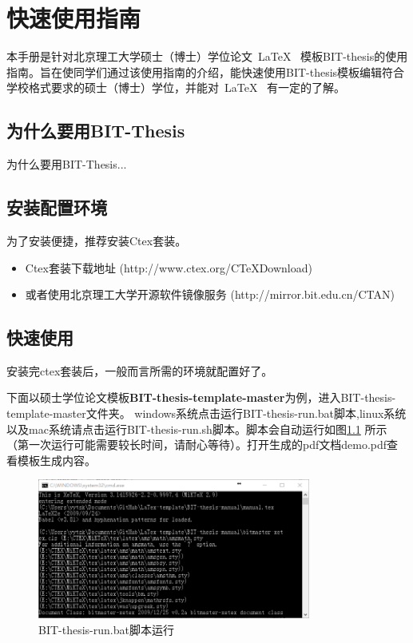 
\chapter{快速使用指南}
\label{chap:what}

本手册是针对北京理工大学硕士（博士）学位论文~\LaTeX~ 模板BIT-thesis的使用指南。旨在使同学们通过该使用指南的介绍，能快速使用BIT-thesis模板编辑符合学校格式要求的硕士（博士）学位，并能对~\LaTeX~ 有一定的了解。

\section{为什么要用BIT-Thesis}
\label{sec:why}
为什么要用BIT-Thesis...

\section{安装配置环境}
\label{sec:requirements}

为了安装便捷，推荐安装Ctex套装。

\begin{itemize}
\item Ctex套装下载地址 
(http://www.ctex.org/CTeXDownload)

\item 或者使用北京理工大学开源软件镜像服务
(http://mirror.bit.edu.cn/CTAN)

\end{itemize}



\section{快速使用}
\label{sec:process}

安装完ctex套装后，一般而言所需的环境就配置好了。

下面以硕士学位论文模板\textbf{BIT-thesis-template-master}为例，进入BIT-thesis-template-master文件夹。
windows系统点击运行BIT-thesis-run.bat脚本,linux系统以及mac系统请点击运行BIT-thesis-run.sh脚本。脚本会自动运行如图\ref{fig:run} 所示（第一次运行可能需要较长时间，请耐心等待）。打开生成的pdf文档demo.pdf查看模板生成内容。
 
\begin{figure}[!htp]
  \centering
  \includegraphics[width=0.8\textwidth]{figures/BIT-thesis-run}
  \caption{BIT-thesis-run.bat脚本运行}
  \label{fig:run}
\end{figure}



